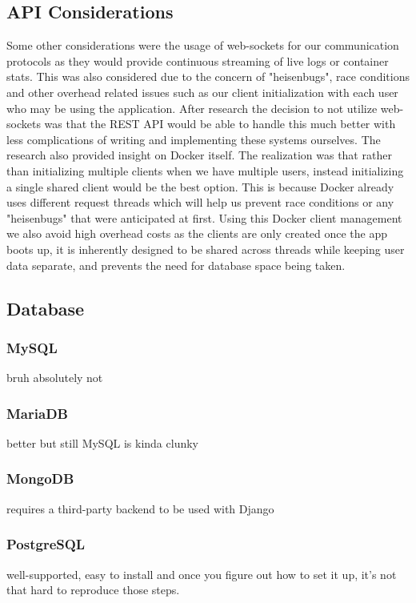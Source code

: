\documentclass[12pt]{article}
\begin{document}
\subsection{API Considerations} \label{subsec:api-considerations}
Some other considerations were the usage of web-sockets for our communication protocols as they would provide continuous streaming of live logs or container stats. This was also considered due to the concern of "heisenbugs", race conditions and other overhead related issues such as our client initialization with each user who may be using the application. After research the decision to not utilize web-sockets was that the REST API would be able to handle this much better with less complications of writing and implementing these systems ourselves. The research also provided insight on Docker itself. The realization was that rather than initializing multiple clients when we have multiple users, instead initializing a single shared client would be the best option. This is because Docker already uses different request threads which will help us prevent race conditions or any "heisenbugs" that were anticipated at first. Using this Docker client management we also avoid high overhead costs as the clients are only created once the app boots up, it is inherently designed to be shared across threads while keeping user data separate, and prevents the need for database space being taken.

\subsection{Database}

\subsubsection{MySQL}
bruh absolutely not

\subsubsection{MariaDB}
better but still MySQL is kinda clunky

\subsubsection{MongoDB}
requires a third-party backend to be used with Django

\subsubsection{PostgreSQL}
well-supported, easy to install and once you figure out how to set it up, it's not that hard to reproduce those steps.
\end{document}
